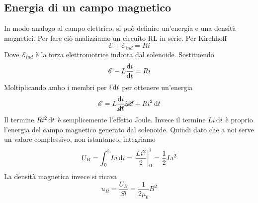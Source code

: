 \subsection{Energia di un campo magnetico}
In modo analogo al campo elettrico, si può definire un'energia e una densità magnetici. Per fare 
ciò analizziamo un circuito RL in serie. Per Kirchhoff
\begin{equation*}
  \mathcal{E} + \mathcal{E}_{ind} = Ri
\end{equation*}
Dove $\mathcal{E}_{ind}$ è la forza elettromotrice indotta dal solenoide. Sostituendo
\begin{equation*}
  \mathcal{E} -L\frac{\mathop{}\!\mathrm{d} i}{\mathop{}\!\mathrm{d} t} = Ri
\end{equation*}
Moltiplicando ambo i membri per $i\mathop{}\!\mathrm{d} t$ per ottenere un'energia
\begin{equation*}
  \mathcal{E} = L\frac{\mathop{}\!\mathrm{d} i}{\cancel{\mathop{}\!\mathrm{d} t}}i\cancel{\mathop{}\!\mathrm{d} t}+Ri^2\mathop{}\!\mathrm{d} t
\end{equation*}
Il termine $Ri^2\mathop{}\!\mathrm{d} t$ è semplicemente l'effetto Joule. Invece il termine $Li\mathop{}\!\mathrm{d} i$ è proprio
l'energia del campo magnetico generato dal solenoide. Quindi dato che a noi serve un valore
complessivo, non istantaneo, integriamo
\begin{equation*}
  U_B = \int_0^i Li\mathop{}\!\mathrm{d} i = \left.\frac{Li^2}{2}\right|_0^i = \frac{1}{2}Li^2
\end{equation*}
La densità magnetica invece si ricava
\begin{equation*}
  u_B = \frac{U_B}{Sl} = \frac{1}{2\mu_0}B^2
\end{equation*}

